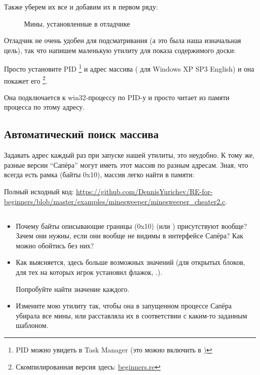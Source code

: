 Также уберем их все и добавим их в первом ряду: 

\begin{figure}[H]
\centering
{}
\caption{Мины, установленные в отладчике}
\label{fig:minesweeper2}
\end{figure}

Отладчик не очень удобен для подсматривания (а это была наша изначальная цель), так что напишем маленькую
утилиту для показа содержимого доски:



Просто установите \ac{PID}
\footnote{PID можно увидеть в Task Manager 
(это можно включить в )} 
и адрес массива ( для Windows XP SP3 English) 
и она покажет его
\footnote{Скомпилированная версия здесь: 
\href{http://go.yurichev.com/17165}{beginners.re}}.

Она подключается к win32-процессу по \ac{PID}-у и просто читает из памяти процесса по этому адресу.

\subsection{Автоматический поиск массива}

Задавать адрес каждый раз при запуске нашей утилиты, это неудобно.
К тому же, разные версии ``Сапёра'' могут иметь этот массив по разным адресам.
Зная, что всегда есть рамка (байты 0x10), массив легко найти в памяти:



Полный исходный код: \url{https://github.com/DennisYurichev/RE-for-beginners/blob/master/examples/minesweeper/minesweeper_cheater2.c}.

\subsection{\Exercises}

\begin{itemize}

\item
Почему байты описывающие границы (0x10) (или ) присутствуют вообще?
Зачем они нужны, если они вообще не видимы в интерфейсе Сапёра?
Как можно обойтись без них?

\item
Как выясняется, здесь больше возможных значений (для открытых блоков, для тех на которых игрок установил
флажок, \etc{}.).
	
Попробуйте найти значение каждого.

\item Измените мою утилиту так, чтобы она в запущенном процессе Сапёра убирала все мины, 
или расставляла их в соответствии с каким-то заданным шаблоном.

\end{itemize}
